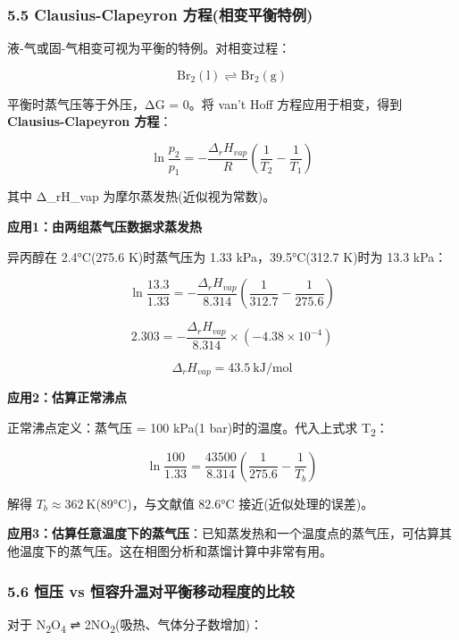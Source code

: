 \documentclass[a4paper,11pt]{ctexart}
\begin{document}
\subsubsection{5.5 Clausius-Clapeyron 方程(相变平衡特例)}\label{clausius-clapeyron-ux65b9ux7a0bux76f8ux53d8ux5e73ux8861ux7279ux4f8b}

液-气或固-气相变可视为平衡的特例。对相变过程：

\[
\mathrm{Br_2(l) \rightleftharpoons Br_2(g)}
\]

平衡时蒸气压等于外压，ΔG = 0。将 van't Hoff 方程应用于相变，得到 \textbf{Clausius-Clapeyron 方程}：

\[
\boxed{\ln\frac{p_2}{p_1} = -\frac{\Delta_rH_{vap}}{R}\left(\frac{1}{T_2} - \frac{1}{T_1}\right)}
\]

其中 Δ\_rH\_vap 为摩尔蒸发热(近似视为常数)。

\textbf{应用1：由两组蒸气压数据求蒸发热}

异丙醇在 2.4°C(275.6 K)时蒸气压为 1.33 kPa，39.5°C(312.7 K)时为 13.3 kPa：

\[
\ln\frac{13.3}{1.33} = -\frac{\Delta_rH_{vap}}{8.314}\left(\frac{1}{312.7} - \frac{1}{275.6}\right)
\]

\[
2.303 = -\frac{\Delta_rH_{vap}}{8.314} \times (-4.38 \times 10^{-4})
\]

\[
\Delta_rH_{vap} = 43.5\ \mathrm{kJ/mol}
\]

\textbf{应用2：估算正常沸点}

正常沸点定义：蒸气压 = 100 kPa(1 bar)时的温度。代入上式求 T\textsubscript{2}：

\[
\ln\frac{100}{1.33} = \frac{43500}{8.314}\left(\frac{1}{275.6} - \frac{1}{T_b}\right)
\]

解得 \(T_b \approx 362\ \mathrm{K}\)(89°C)，与文献值 82.6°C 接近(近似处理的误差)。

\textbf{应用3：估算任意温度下的蒸气压}：已知蒸发热和一个温度点的蒸气压，可估算其他温度下的蒸气压。这在相图分析和蒸馏计算中非常有用。

\subsubsection{5.6 恒压 vs 恒容升温对平衡移动程度的比较}\label{ux6052ux538b-vs-ux6052ux5bb9ux5347ux6e29ux5bf9ux5e73ux8861ux79fbux52a8ux7a0bux5ea6ux7684ux6bd4ux8f83}

对于 N\textsubscript{2}O\textsubscript{4} ⇌ 2NO\textsubscript{2}(吸热、气体分子数增加)：
\end{document}
